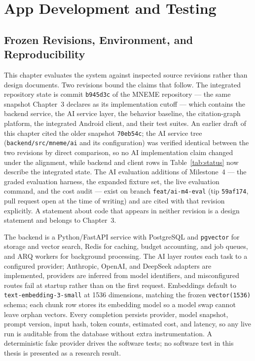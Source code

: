 
\chapter{App Development and Testing}

\section{Frozen Revisions, Environment, and Reproducibility}

This chapter evaluates the system against inspected source revisions rather than design documents.
Two revisions bound the claims that follow.
The integrated repository state is commit \texttt{b945d3c} of the MNEME repository --- the same snapshot Chapter~3 declares as its implementation cutoff --- which contains the backend service, the AI service layer, the behavior baseline, the citation-graph platform, the integrated Android client, and their test suites.
An earlier draft of this chapter cited the older snapshot \texttt{70eb54c}; the AI service tree (\texttt{backend/src/mneme/ai} and its configuration) was verified identical between the two revisions by direct comparison, so no AI implementation claim changed under the alignment, while backend and client rows in Table~\ref{tab:status} now describe the integrated state.
The AI evaluation additions of Milestone~4 --- the graded evaluation harness, the expanded fixture set, the live evaluation command, and the cost audit --- exist on branch \texttt{feat/ai-m4-eval} (tip \texttt{59af174}, pull request open at the time of writing) and are cited with that revision explicitly.
A statement about code that appears in neither revision is a design statement and belongs to Chapter~3.

The backend is a Python/FastAPI service with PostgreSQL and \texttt{pgvector} for storage and vector search, Redis for caching, budget accounting, and job queues, and ARQ workers for background processing.
The AI layer routes each task to a configured provider; Anthropic, OpenAI, and DeepSeek adapters are implemented, providers are inferred from model identifiers, and misconfigured routes fail at startup rather than on the first request.
Embeddings default to \texttt{text-embedding-3-small} at 1536 dimensions, matching the frozen \texttt{vector(1536)} schema; each chunk row stores its embedding model so a model swap cannot leave orphan vectors.
Every completion persists provider, model snapshot, prompt version, input hash, token counts, estimated cost, and latency, so any live run is auditable from the database without extra instrumentation.
A deterministic fake provider drives the software tests; no software test in this thesis is presented as a research result.


